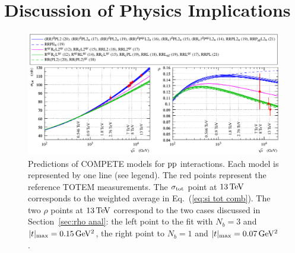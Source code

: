 \section{Discussion of Physics Implications}
\label{sec:discussion}

\begin{figure}
\begin{center}
\includegraphics{fig/compete_bands_si_tot_rho.pdf}
\caption{%
Predictions of COMPETE models \cite{compete-details} for $\rm pp$ interactions. Each model is represented by one line (see legend). The red points represent the reference TOTEM measurements. The $\sigma_{\rm tot}$ point at $13\,{\rm TeV}$ corresponds to the weighted average in Eq.~(\ref{eq:si tot comb}). The two $\rho$ points at $13\,{\rm TeV}$ correspond to the two cases discussed in Section~\ref{sec:rho anal}: the left point to the fit with $N_b=3$ and $|t|_{\rm max} = 0.15\,{\rm GeV^2}$, the right point to $N_b=1$ and $|t|_{\rm max} = 0.07\,{\rm GeV^2}$.
}
\label{fig:comp bands}
\end{center}
\end{figure}

